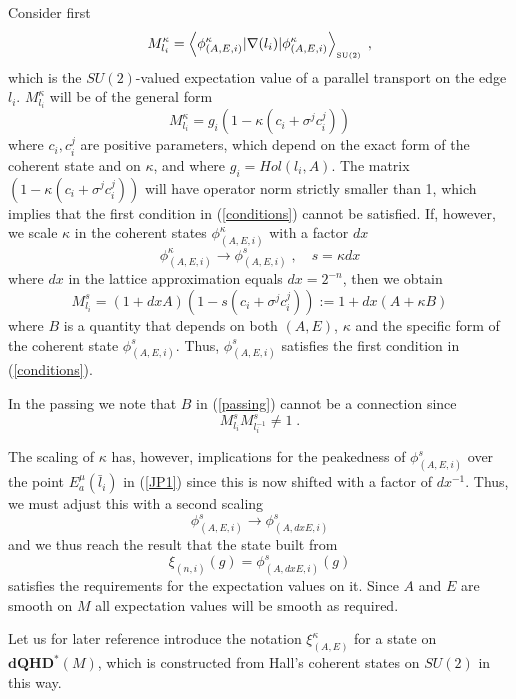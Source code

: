 \documentclass[12pt]{article}
\newcommand{\nn}{\nonumber}
\def\m{\mu}
\begin{document}
Consider first
$$
M^\kappa_{l_i}=\left\langle \phi_{(A,E,i)}^\kappa \vert \nabla(l_{i})\vert \phi_{(A,E,i)}^\kappa \right\rangle_{\mbox{\tiny SU(2)}} \;,
$$
which is the $SU(2)$-valued expectation value of a parallel transport on the edge $l_i$. $M^\kappa_{l_i}$ will be of the general form
\begin{equation}
M_{l_i}^\kappa = g_i (1 - \kappa (c_i + \sigma^j c_i^j))
\nn%
\end{equation}
where $c_i,c_i^j$ are positive parameters, which depend on the exact form of the coherent state and on $\kappa$, and where $g_i=Hol(l_i,A)$. The matrix $(1 - \kappa(c_i + \sigma^j c_i^j))$ will have operator norm strictly smaller than 1, which implies that the first condition in (\ref{conditions}) cannot be satisfied.
If, however, we scale $\kappa$ in the coherent states $ \phi_{(A,E,i)}^\kappa$ with a factor $dx$
\begin{equation}
 \phi_{(A,E,i)}^\kappa \rightarrow  \phi_{(A,E,i)}^{ s } \;,\quad s = \kappa dx
 \label{scaling}
\end{equation}
where $dx$ in the lattice approximation equals $dx= 2^{-n}$, then we obtain
\begin{equation}
M_{l_i}^s = (1+ dx A) (1 - s (c_i + \sigma^j c_i^j)) := 1 + dx(A +\kappa B)
\label{passing}
\end{equation}
where $B$ is a quantity that depends on both $(A,E)$, $\kappa$ and the specific form of the coherent state $\phi^s_{(A,E,i)}$. Thus, $\phi^s_{(A,E,i)}$ satisfies the first condition in (\ref{conditions}).


In the passing we note that $B$ in (\ref{passing}) cannot be a connection since 
$$ M_{l_i}^{s} M_{l_i^{-1}}^{s}\not= 1\;. $$

The scaling of $\kappa$ has, however, implications for the peakedness of $\phi^s_{(A,E,i)}$ over the point $E_a^\m(\bar{l}_{i})$ in (\ref{JP1}) since this is now shifted with a factor of $dx^{-1}$. Thus, we must adjust this with a second scaling
$$
 \phi_{(A,E,i)}^{ s } \rightarrow  \phi_{(A, dx E,i)}^{ s }
$$
and we thus reach the result that the state built from
$$
\xi_{(n,i)}(g) = \phi^{s}_{(A, dx E,i)}(g)
$$
satisfies the requirements for the expectation values on it. Since $A$ and $E$ are smooth on $M$ all expectation values will be smooth as required.

Let us for later reference introduce the notation
$
 \xi^{\kappa}_{(A,E)}
$
for a state on $\mathbf{dQHD}^*(M)$, which is constructed from Hall's coherent states on $SU(2)$ in this way.\\
\end{document}
